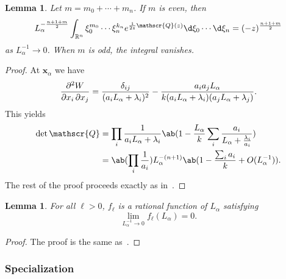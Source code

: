 \documentclass[10pt]{amsart}
\newtheorem{lem}[thm]{Lemma}
\theoremstyle{definition}
\theoremstyle{remark}
\theoremstyle{plain}
\theoremstyle{definition}
\theoremstyle{remark}
\newcommand{\R}{\mathbb{R}}
\newcommand{\msc}[1]{\mathscr{#1}}
\newcommand{\mbf}[1]{\mathbf{#1}}
\newcommand{\1}{\mathbf{1}}
\newcommand{\2}{\mathbf{2}}
\newcommand{\3}{\mathbf{3}}
\numberwithin{equation}{section}
\begin{document}
\begin{lem}
    Let $m = m_0 + \cdots + m_n$. If $m$ is even, then
    \[ L_{\alpha}^{-\frac{n+1+m}{2}} \int_{\R^n} \xi_0^{m_0} \cdots \xi_n^{k_n} e^{\frac{1}{2z} \msc{Q}(z)} \d \xi_0 \cdots \d \xi_n = (-z)^{\frac{n+1+m}{2}} \]
    as $L_{\alpha}^{-1} \to 0$. When $m$ is odd, the integral vanishes.
\end{lem}

\begin{proof}
    At $\mbf{x}_{\alpha}$ we have
    \[ \pdv{W}{x_i,x_j} = \frac{\delta_{ij}}{(a_i L_{\alpha}+\lambda_i)^2} - \frac{a_i a_j L_{\alpha}}{k (a_i L_{\alpha} + \lambda_i)(a_j L_{\alpha} + \lambda_j)}. \]
    This yields
    \begin{align*}
        \det \msc{Q} &= \prod_i \frac{1}{a_iL_{\alpha}+\lambda_i} \ab(1- \frac{L_{\alpha}}{k} \sum_i \frac{a_i}{L_{\alpha} + \frac{\lambda_i}{a_i}}) \\
        &= \ab( \prod_i \frac{1}{a_i} ) L_{\alpha}^{-(n+1)} \ab(1-\frac{\sum_i a_i}{k} + O(L_{\alpha}^{-1})).
    \end{align*}
    The rest of the proof proceeds exactly as in~\cite[Lemma 6.4]{nmsp2}.
\end{proof}

\begin{lem}\label{lem:asymptotics}
    For all $\ell > 0$, $f_{\ell}$ is a rational function of $L_{\alpha}$ satisfying
    \[ \lim_{L_{\alpha}^{-1} \to 0} f_{\ell}(L_{\alpha}) = 0. \]
\end{lem}

\begin{proof}
    The proof is the same as~\cite[Proposition 6.1]{nmsp2}.
\end{proof}

\subsubsection{Specialization}%
\label{ssub:Specialization}
\end{document}
